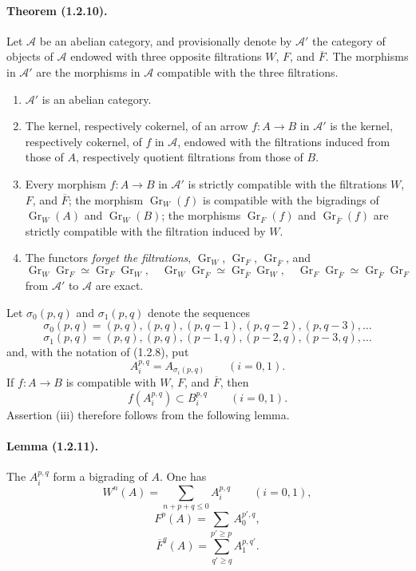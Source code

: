 \documentclass[10pt]{article}
\newcommand{\Gr}{\operatorname{Gr}}
\newcommand{\calA}{\mathcal A}
\begin{document}
\paragraph{Theorem (1.2.10).} Let $\calA$ be an abelian category, and provisionally denote by $\calA'$ the category of objects of $\calA$ endowed with three opposite filtrations $W$, $F$, and $\overline F$. The morphisms in $\calA'$ are the morphisms in $\calA$ compatible with the three filtrations.
\begin{enumerate}[label=(\roman*)]
\item $\calA'$ is an abelian category.
\item The kernel, respectively cokernel, of an arrow $f:A\to B$ in $\calA'$ is the kernel, respectively cokernel, of $f$ in $\calA$, endowed with the filtrations induced from those of $A$, respectively quotient filtrations from those of $B$.
\item Every morphism $f:A\to B$ in $\calA'$ is strictly compatible with the filtrations $W$, $F$, and $\overline F$; the morphism $\Gr_W(f)$ is compatible with the bigradings of $\Gr_W(A)$ and $\Gr_W(B)$; the morphisms $\Gr_F(f)$ and $\Gr_{\overline F}(f)$ are strictly compatible with the filtration induced by $W$.
\item The functors \emph{forget the filtrations}, $\Gr_W$, $\Gr_F$, $\Gr_{\overline F}$, and
\[
\Gr_W\Gr_F\simeq\Gr_F\Gr_W,
\quad
\Gr_W\Gr_{\overline F}\simeq\Gr_{\overline F}\Gr_W,
\quad
\Gr_F\Gr_{\overline F}\simeq\Gr_{\overline F}\Gr_F
\]
from $\calA'$ to $\calA$ are exact.
\end{enumerate}

Let $\sigma_0(p,q)$ and $\sigma_1(p,q)$ denote the sequences
\[
\sigma_0(p,q)=(p,q),(p,q),(p,q-1),(p,q-2),(p,q-3),\ldots
\]
\[
\sigma_1(p,q)=(p,q),(p,q),(p-1,q),(p-2,q),(p-3,q),\ldots
\]
and, with the notation of (1.2.8), put
\[
A_i^{p,q}=A_{\sigma_i(p,q)}\qquad(i=0,1).
\]
If $f:A\to B$ is compatible with $W$, $F$, and $\overline F$, then
\[
\tag{1.2.10.1}
f(A_i^{p,q})\subset B_i^{p,q}\qquad(i=0,1).
\]
Assertion (iii) therefore follows from the following lemma.

\paragraph{Lemma (1.2.11).} The $A_i^{p,q}$ form a bigrading of $A$. One has
\[
\tag{1.2.11.1}
W^n(A)=\sum_{n+p+q\le0} A_i^{p,q}\qquad(i=0,1),
\]
\[
\tag{1.2.11.2}
F^p(A)=\sum_{p'\ge p} A_0^{p',q},
\]
\[
\tag{1.2.11.3}
\overline F^q(A)=\sum_{q'\ge q} A_1^{p,q'}.
\]
\end{document}
